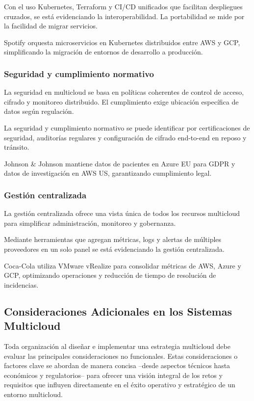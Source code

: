 {                Con el uso Kubernetes, Terraform y CI/CD unificados que facilitan despliegues cruzados, se está evidenciando la interoperabilidad. La portabilidad se mide por la facilidad de migrar servicios.
            
                Spotify orquesta microservicios en Kubernetes distribuidos entre AWS y GCP, simplificando la migración de entornos de desarrollo a producción.
            
            \subsubsection{Seguridad y cumplimiento normativo}
                La seguridad en multicloud se basa en políticas coherentes de control de acceso, cifrado y monitoreo distribuido. El cumplimiento exige ubicación específica de datos según regulación.
                
                La seguridad y cumplimiento normativo se puede identificar por certificaciones de seguridad, auditorías regulares y configuración de cifrado end-to-end en reposo y tránsito.
                
                Johnson \& Johnson mantiene datos de pacientes en Azure EU para GDPR y datos de investigación en AWS US, garantizando cumplimiento legal.
            
            \subsubsection{Gestión centralizada}
                La gestión centralizada ofrece una vista única de todos los recursos multicloud para simplificar administración, monitoreo y gobernanza.
            
                Mediante herramientas que agregan métricas, logs y alertas de múltiples proveedores en un solo panel se está evidenciando la gestión centralizada.
                
                Coca-Cola utiliza VMware vRealize para consolidar métricas de AWS, Azure y GCP, optimizando operaciones y reducción de tiempo de resolución de incidencias.
            
        \subsection[Consideraciones Especiales]{Consideraciones Adicionales en los Sistemas Multicloud}
            Toda organización al diseñar e implementar una estrategia multicloud debe evaluar las principales consideraciones no funcionales. Estas consideraciones o factores clave se abordan de manera concisa --desde aspectos técnicos hasta económicos y regulatorios-- para ofrecer una visión integral de los retos y requisitos que influyen directamente en el éxito operativo y estratégico de un entorno multicloud.

}
